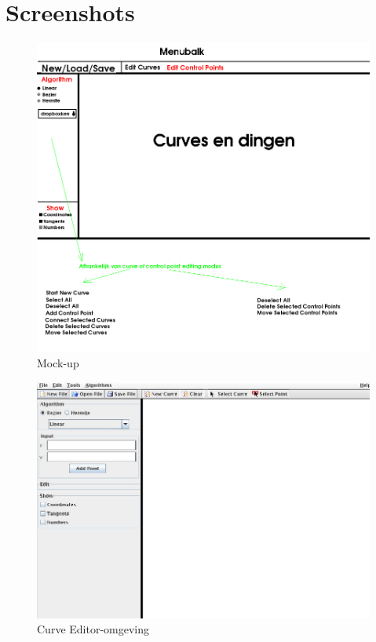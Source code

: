 \documentclass[a4paper,11pt,oneside, titlepage]{article}
\begin{document}
\section{Screenshots}
\begin{figure}[htbp]
\centering
\includegraphics[scale=0.4]{./mockup.png}
\caption{Mock-up}\label{mockup}
\end{figure}
\begin{figure}[htbp]
\centering
\includegraphics[scale=0.4]{./screenies/start.jpg}
\caption{Curve Editor-omgeving}\label{start}
\end{figure}
\end{document}

